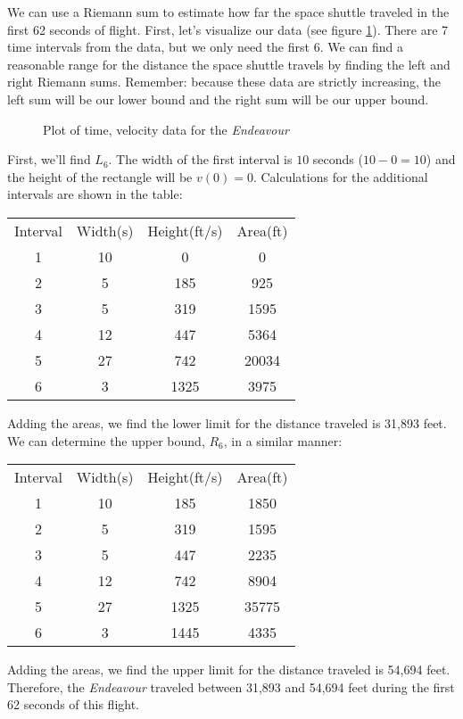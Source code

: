 We can use a Riemann sum to estimate how far the space shuttle traveled in the first 62 seconds of flight. First, let's visualize our data (see figure \ref{fig:endeavourscatter}). There are 7 time intervals from the data, but we only need the first 6. We can find a reasonable range for the distance the space shuttle travels by finding the left and right Riemann sums. Remember: because these data are strictly increasing, the left sum will be our lower bound and the right sum will be our upper bound. 

\begin{figure}
	\centering
	\caption{Plot of time, velocity data for the \textit{Endeavour}}
	\label{fig:endeavourscatter}
\end{figure}

First, we'll find $L_6$. The width of the first interval is $10$ seconds ($10-0=10$) and the height of the rectangle will be $v(0) = 0$. Calculations for the additional intervals are shown in the table:
\begin{center}
\begin{tabular}{c|c|c|c}
	Interval & Width(s) & Height(ft/s) & Area(ft) \\
	1 & 10 & 0 & 0 \\
	2 & 5 & 185 & 925 \\
	3 & 5 & 319 & 1595 \\
	4 & 12 & 447 & 5364 \\
	5 & 27 & 742 & 20034 \\
	6 & 3 & 1325 & 3975 \\
\end{tabular}
\end{center}

Adding the areas, we find the lower limit for the distance traveled is 31,893 feet. We can determine the upper bound, $R_6$, in a similar manner:
\begin{center}
\begin{tabular}{c|c|c|c}
	Interval & Width(s) & Height(ft/s) & Area(ft) \\
	1 & 10 & 185 & 1850 \\
	2 & 5 & 319 & 1595 \\
	3 & 5 & 447 & 2235 \\
	4 & 12 & 742 & 8904 \\
	5 & 27 & 1325 & 35775 \\
	6 & 3 & 1445 & 4335 \\
\end{tabular}
\end{center}
Adding the areas, we find the upper limit for the distance traveled is 54,694 feet. Therefore, the \textit{Endeavour} traveled between 31,893 and 54,694 feet during the first 62 seconds of this flight. 

